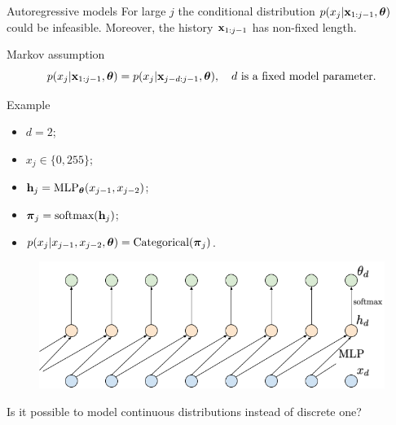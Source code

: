\begin{frame}{Autoregressive models}
	For large $j$ the conditional distribution $p(x_j | \mathbf{x}_{1:j - 1}, \boldsymbol{\theta})$ could be infeasible. Moreover, the history $\mathbf{x}_{1:j-1}$ has non-fixed length.
	\begin{block}{Markov assumption}
		\vspace{-0.5cm}
		\[
			p(x_j | \mathbf{x}_{1:j - 1}, \boldsymbol{\theta}) = p(x_j | \mathbf{x}_{j - d:j - 1}, \boldsymbol{\theta}), \quad d \text{ is a fixed model parameter}.
		\]
	\end{block}
	\vspace{-0.5cm}
	\begin{block}{Example}
		\begin{minipage}[t]{0.39\columnwidth}
			{\small
			\begin{itemize}
				\item $d = 2$;
				\item $x_j \in \{0, 255\}$;
				\item $\mathbf{h}_j = \text{MLP}_{\boldsymbol{\theta}}(x_{j - 1}, x_{j - 2})$;
				\item $\boldsymbol{\pi}_j = \text{softmax}(\mathbf{h}_j)$;
				\item $p(x_j | x_{j - 1}, x_{j - 2}, \boldsymbol{\theta}) = \text{Categorical}(\boldsymbol{\pi}_j)$.
			\end{itemize}
			}
		\end{minipage}%
		\begin{minipage}[t]{0.61\columnwidth}
			 \begin{figure}
			   \centering
			   \includegraphics[width=1.0\linewidth]{figs/sequential_MLP}
			 \end{figure}
			 Is it possible to model continuous distributions instead of discrete one?
		\end{minipage}
	\end{block}
\end{frame}
